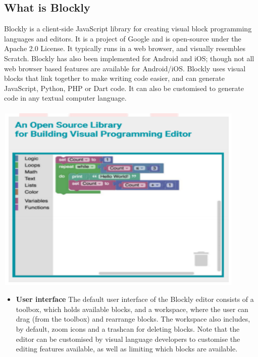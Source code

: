 \documentclass[a4paper,12pt,oneside]{book}
\begin{document}
\begin{itemize}
  \subsection{What is Blockly}
  Blockly is a client-side JavaScript library for creating visual block programming languages and editors. It is a project of Google and is open-source under the Apache 2.0 License. It typically runs in a web browser, and visually resembles Scratch. Blockly has also been implemented for Android and iOS; though not all web browser based features are available for Android/iOS.
  Blockly uses visual blocks that link together to make writing code easier, and can generate JavaScript, Python, PHP or Dart code. It can also be customised to generate code in any textual computer language.\\[0.5cm]
  \\\hfill\includegraphics[width=12cm, height=9cm]{imag1}\\[0.5cm]
  \begin{itemize}
    \item\textbf{User interface}
    The default user interface of the Blockly editor consists of a toolbox, which holds available blocks, and a workspace, where the user can drag (from the toolbox) and rearrange blocks. The workspace also includes, by default, zoom icons and a trashcan for deleting blocks. Note that the editor can be customised by visual language developers to customise the editing features available, as well as limiting which blocks are available.
  \end{itemize}

\end{itemize}
\end{document}
